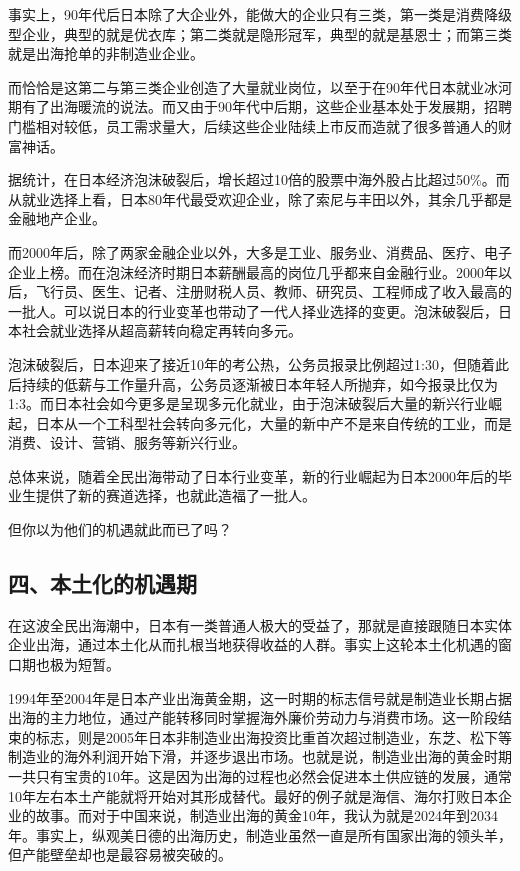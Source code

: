 事实上，90年代后日本除了大企业外，能做大的企业只有三类，第一类是消费降级型企业，典型的就是优衣库；第二类就是隐形冠军，典型的就是基恩士；而第三类就是出海抢单的非制造业企业。

而恰恰是这第二与第三类企业创造了大量就业岗位，以至于在90年代日本就业冰河期有了出海暖流的说法。而又由于90年代中后期，这些企业基本处于发展期，招聘门槛相对较低，员工需求量大，后续这些企业陆续上市反而造就了很多普通人的财富神话。

据统计，在日本经济泡沫破裂后，增长超过10倍的股票中海外股占比超过50\%。而从就业选择上看，日本80年代最受欢迎企业，除了索尼与丰田以外，其余几乎都是金融地产企业。

而2000年后，除了两家金融企业以外，大多是工业、服务业、消费品、医疗、电子企业上榜。而在泡沫经济时期日本薪酬最高的岗位几乎都来自金融行业。2000年以后，飞行员、医生、记者、注册财税人员、教师、研究员、工程师成了收入最高的一批人。可以说日本的行业变革也带动了一代人择业选择的变更。泡沫破裂后，日本社会就业选择从超高薪转向稳定再转向多元。

泡沫破裂后，日本迎来了接近10年的考公热，公务员报录比例超过1:30，但随着此后持续的低薪与工作量升高，公务员逐渐被日本年轻人所抛弃，如今报录比仅为1:3。而日本社会如今更多是呈现多元化就业，由于泡沫破裂后大量的新兴行业崛起，日本从一个工科型社会转向多元化，大量的新中产不是来自传统的工业，而是消费、设计、营销、服务等新兴行业。

总体来说，随着全民出海带动了日本行业变革，新的行业崛起为日本2000年后的毕业生提供了新的赛道选择，也就此造福了一批人。

但你以为他们的机遇就此而已了吗？

\subsection{四、本土化的机遇期}

在这波全民出海潮中，日本有一类普通人极大的受益了，那就是直接跟随日本实体企业出海，通过本土化从而扎根当地获得收益的人群。事实上这轮本土化机遇的窗口期也极为短暂。

1994年至2004年是日本产业出海黄金期，这一时期的标志信号就是制造业长期占据出海的主力地位，通过产能转移同时掌握海外廉价劳动力与消费市场。这一阶段结束的标志，则是2005年日本非制造业出海投资比重首次超过制造业，东芝、松下等制造业的海外利润开始下滑，并逐步退出市场。也就是说，制造业出海的黄金时期一共只有宝贵的10年。这是因为出海的过程也必然会促进本土供应链的发展，通常10年左右本土产能就将开始对其形成替代。最好的例子就是海信、海尔打败日本企业的故事。而对于中国来说，制造业出海的黄金10年，我认为就是2024年到2034年。事实上，纵观美日德的出海历史，制造业虽然一直是所有国家出海的领头羊，但产能壁垒却也是最容易被突破的。

